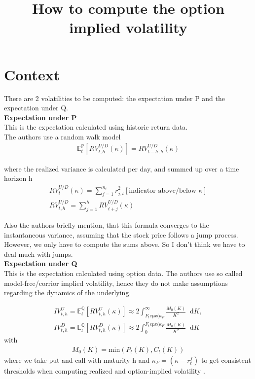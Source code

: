\documentclass{article}
\title{How to compute the option implied volatility}
\newcommand*\diff{\mathop{}\!\mathrm{d}}
\begin{document}
\maketitle

\section{Context}\label{sec:1}

There are 2 volatilities to be computed: the expectation under P and the expectation under Q.\\

\textbf{Expectation under P}\\
This is the expectation calculated using historic return data.\\

The authors use a random walk model 
\begin{align}\label{eq:Ex_p}
\mathbb{E}_{t}^{\mathbb{P}} \left[ RV_{t,h}^{U/D} (\kappa) \right] = RV_{t-h,h}^{U/D}(\kappa)
\end{align}

where the realized variance is calculated per day, and summed up over a time horizon h
\begin{align}\label{eq:RV_p}
RV_{t}^{U/D}(\kappa) = \sum_{j=1}^{n_{t}} r_{j,t}^{2} [\text{indicator above/below $\kappa$}]\\
RV_{t,h}^{U/D} = \sum_{j=1}^{h} RV_{t+j}^{U/D}(\kappa)
\end{align}

Also the authors briefly mention, that this formula converges to the instantaneous variance, assuming that the stock price follows a jump process. However, we only have to compute the sums above. So I don't think we have to deal much with jumps.\\

\textbf{Expectation under Q}\\
This is the expectation calculated using option data. The authors use so called model-free/corrior implied volatility, hence they do not make assumptions regarding the dynamics of the underlying.

\begin{align}\label{eq:Ex_q}
IV_{t,h}^{U} = \mathbb{E}_{t}^{\mathbb{Q}} \left[ RV_{t,h}^{U} (\kappa) \right] \approx 2 \int_{F_{t}epx(\kappa_{F}}^{\infty} \frac{M_{0}(K)}{K^{2}} \diff K,\\
IV_{t,h}^{D} = \mathbb{E}_{t}^{\mathbb{Q}} \left[ RV_{t,h}^{D} (\kappa) \right] \approx 2 \int_{0}^{F_{t}epx(\kappa_{F}} \frac{M_{0}(K)}{K^{2}} \diff K
\end{align}
with
\begin{align*}
M_{0}(K) = \text{min}(P_{t}(K), C_{t}(K))
\end{align*}
where we take put and call with maturity h and $\kappa_{F} = (\kappa - r_{t}^{f})$ to get consistent thresholds when computing realized and option-implied volatility .\\
\end{document}

